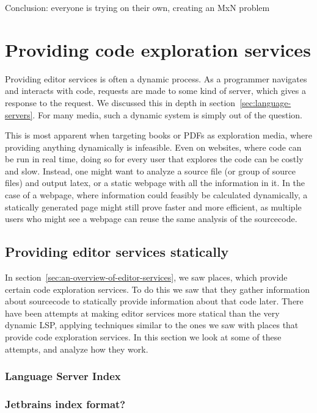 Conclusion: everyone is trying on their own, creating an MxN problem

\section{Providing code exploration services}\label{sec:providing-code-exploration-services}

Providing editor services is often a dynamic process.
As a programmer navigates and interacts with code, requests are made to some kind of server, which gives a response to the request.
We discussed this in depth in section~\ref{sec:language-servers}.
For many media, such a dynamic system is simply out of the question.

This is most apparent when targeting books or PDFs as exploration media, where providing anything dynamically is infeasible.
Even on websites, where code can be run in real time, doing so for every user that explores the code can be costly and slow.
Instead, one might want to analyze a source file (or group of source files) and output latex, or a static webpage with all the information in it.
In the case of a webpage, where information could feasibly be calculated dynamically, a statically generated page might still prove faster and
more efficient, as multiple users who might see a webpage can reuse the same analysis of the sourcecode.

\subsection{Providing editor services statically}

In section~\ref{sec:an-overview-of-editor-services}, we saw places, which provide certain code exploration services.
To do this we saw that they gather information about sourcecode to statically provide information about that code later.
There have been attempts at making editor services more statical than the very dynamic \ac{LSP}, applying techniques similar
to the ones we saw with places that provide code exploration services.
In this section we look at some of these attempts, and analyze how they work.

\subsubsection{Language Server Index}
\subsubsection{Jetbrains index format?}
